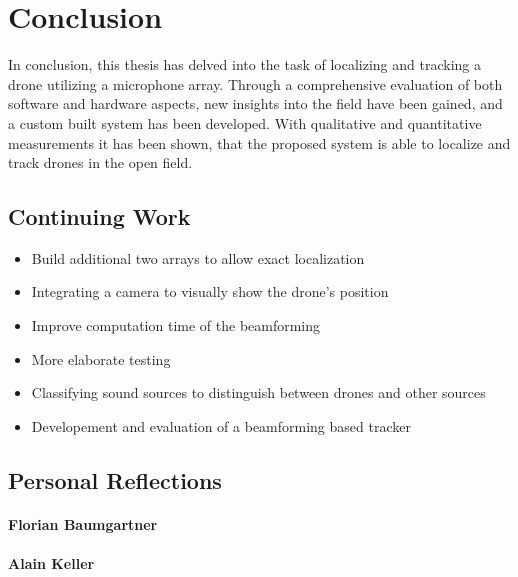 \chapter{Conclusion}
In conclusion, this thesis has delved into the task of
localizing and tracking a drone utilizing a microphone array.
Through a comprehensive evaluation of both software and hardware aspects,
new insights into the field have been gained, and
a custom built system has been developed.
With qualitative and quantitative measurements it has been shown,
that the proposed system is able to localize and track
drones in the open field.

\section{Continuing Work}

\bigskip
\begin{itemize}
	\item Build additional two arrays to allow exact localization
	\item Integrating a camera to visually show the drone's position
	\item Improve computation time of the beamforming
	\item More elaborate testing
	\item Classifying sound sources to distinguish between drones and other sources
	\item Developement and evaluation of a beamforming based tracker
\end{itemize}
\newpage

\newpage
\section{Personal Reflections}
\subsubsection{Florian Baumgartner}

\subsubsection{Alain Keller}
